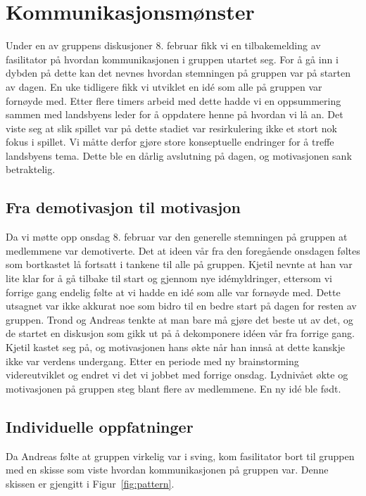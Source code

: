 
\section{Kommunikasjonsmønster} %
Under en av gruppens diskusjoner 8. februar fikk vi en tilbakemelding av
fasilitator på hvordan kommunikasjonen i gruppen utartet seg. For å gå
inn i dybden på dette kan det nevnes hvordan stemningen på gruppen var
på starten av dagen. En uke tidligere fikk vi utviklet en idé som alle på
gruppen var fornøyde med. Etter flere timers arbeid med dette hadde vi
en oppsummering sammen med landsbyens leder for å oppdatere henne på
hvordan vi lå an. Det viste seg at slik spillet var på dette stadiet var
resirkulering ikke et stort nok fokus i spillet. Vi måtte derfor gjøre
store konseptuelle endringer for å treffe landsbyens tema.
Dette ble en dårlig avslutning på dagen, og motivasjonen sank
betraktelig.

\subsection{Fra demotivasjon til motivasjon}
Da vi møtte opp onsdag 8. februar var den generelle stemningen på
gruppen at medlemmene var demotiverte. Det at ideen vår fra den
foregående onsdagen føltes som bortkastet lå fortsatt i tankene til alle
på gruppen. Kjetil nevnte at han var lite klar for å gå tilbake til
start og gjennom nye idémyldringer, ettersom vi forrige gang endelig
følte at vi hadde en idé som alle var fornøyde med. Dette utsagnet var
ikke akkurat noe som bidro til en bedre start på dagen for resten av
gruppen. Trond og Andreas tenkte at man bare må gjøre det beste ut av
det, og de startet en diskusjon som gikk ut på å dekomponere idéen vår
fra forrige gang. Kjetil kastet seg på, og motivasjonen hans økte når
han innså at dette kanskje ikke var verdens undergang. Etter en periode
med ny brainstorming videreutviklet og endret vi det vi jobbet med
forrige onsdag. Lydnivået økte og motivasjonen på gruppen steg blant
flere av medlemmene. En ny idé ble født.

\subsection{Individuelle oppfatninger}
Da Andreas følte at gruppen virkelig var i sving, kom fasilitator bort
til gruppen med en skisse som viste hvordan kommunikasjonen på gruppen
var. Denne skissen er gjengitt i Figur~\ref{fig:pattern}.


